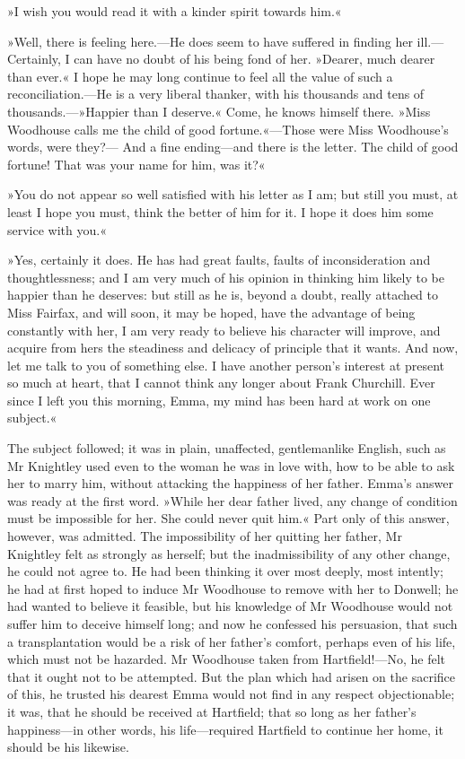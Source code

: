 »I wish you would read it with a kinder spirit towards him.«

»Well, there is feeling here.—He does seem to have suffered in finding her ill.—Certainly, I can have no doubt of his being fond of her. »Dearer, much dearer than ever.« I hope he may long continue to feel all the value of such a reconciliation.—He is a very liberal thanker, with his thousands and tens of thousands.—»Happier than I deserve.« Come, he knows himself there. »Miss Woodhouse calls me the child of good fortune.«—Those were Miss Woodhouse's words, were they?— And a fine ending—and there is the letter. The child of good fortune! That was your name for him, was it?«

»You do not appear so well satisfied with his letter as I am; but still you must, at least I hope you must, think the better of him for it. I hope it does him some service with you.«

»Yes, certainly it does. He has had great faults, faults of inconsideration and thoughtlessness; and I am very much of his opinion in thinking him likely to be happier than he deserves: but still as he is, beyond a doubt, really attached to Miss Fairfax, and will soon, it may be hoped, have the advantage of being constantly with her, I am very ready to believe his character will improve, and acquire from hers the steadiness and delicacy of principle that it wants. And now, let me talk to you of something else. I have another person's interest at present so much at heart, that I cannot think any longer about Frank Churchill. Ever since I left you this morning, Emma, my mind has been hard at work on one subject.«

The subject followed; it was in plain, unaffected, gentlemanlike English, such as Mr Knightley used even to the woman he was in love with, how to be able to ask her to marry him, without attacking the happiness of her father. Emma's answer was ready at the first word. »While her dear father lived, any change of condition must be impossible for her. She could never quit him.« Part only of this answer, however, was admitted. The impossibility of her quitting her father, Mr Knightley felt as strongly as herself; but the inadmissibility of any other change, he could not agree to. He had been thinking it over most deeply, most intently; he had at first hoped to induce Mr Woodhouse to remove with her to Donwell; he had wanted to believe it feasible, but his knowledge of Mr Woodhouse would not suffer him to deceive himself long; and now he confessed his persuasion, that such a transplantation would be a risk of her father's comfort, perhaps even of his life, which must not be hazarded. Mr Woodhouse taken from Hartfield!—No, he felt that it ought not to be attempted. But the plan which had arisen on the sacrifice of this, he trusted his dearest Emma would not find in any respect objectionable; it was, that he should be received at Hartfield; that so long as her father's happiness—in other words, his life—required Hartfield to continue her home, it should be his likewise.

